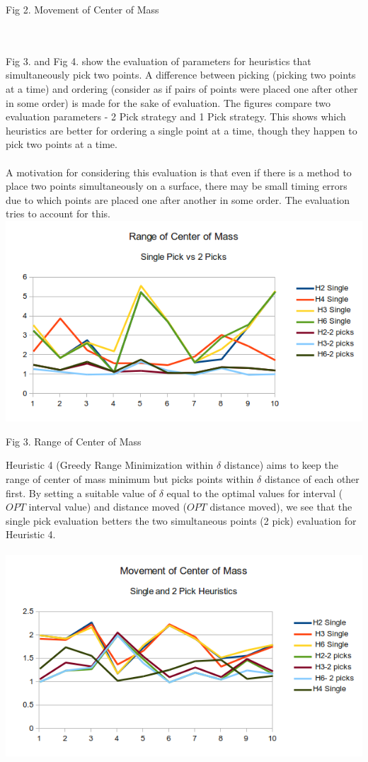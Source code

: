 \documentclass[11pt]{article} %
\begin{document}
\begin{center}
\caption{Fig 2. Movement of Center of Mass}
\end{center}
\\
\\
Fig 3. and Fig 4. show the evaluation of parameters for heuristics that simultaneously pick two points. A difference 
between picking (picking two points at a time) and ordering (consider as if pairs of points were placed one after other
in some order) is made for the sake of evaluation.
The figures compare two evaluation parameters - 2 Pick strategy and 1 Pick strategy. This shows which heuristics are better for ordering a single point at a time, though they happen to pick two points at a time.\\
\\
A motivation for considering this evaluation is that even if there is a method to place two points simultaneously on a
surface, there may be small timing errors due to which points are placed one after another in some order. The evaluation
tries to account for this.
\\
\includegraphics{result2.png}
\begin{center}
\caption{Fig 3. Range of Center of Mass}
\end{center}
Heuristic 4 (Greedy Range Minimization within $\delta$ distance) aims to keep the range of center of mass minimum but picks points within $\delta$ distance of each other first. By setting a suitable value of $\delta$ equal to the optimal values for interval ($OPT$ interval value) and distance moved ($OPT$ distance moved), we see that the single pick evaluation betters the two simultaneous points (2 pick) evaluation for Heuristic 4.\\
\\
\includegraphics{result3.png}
\end{document}
